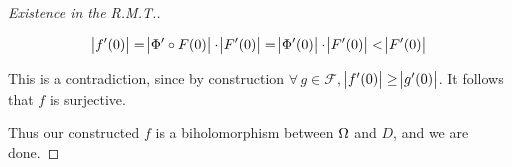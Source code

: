 \begin{proof}[Existence in the R.M.T.]
\begin{enumerate}
 \begin{align*}
     \abs{f'(0)} = \abs{\Phi ' \circ F(0)} \cdot \abs{F'(0)} = \abs{\Phi ' (0)} \cdot \abs{F'(0)} < \abs{F'(0)}
 \end{align*}
 
 This is a contradiction, since by construction $\forall \, g \in \mathscr{F}$, $\abs{f'(0)} \geq \abs{g'(0)}$. It follows that $f$ is surjective.
 
\end{enumerate}

Thus our constructed $f$ is a biholomorphism between $\Omega$ and $D$, and we are done.

\end{proof}

